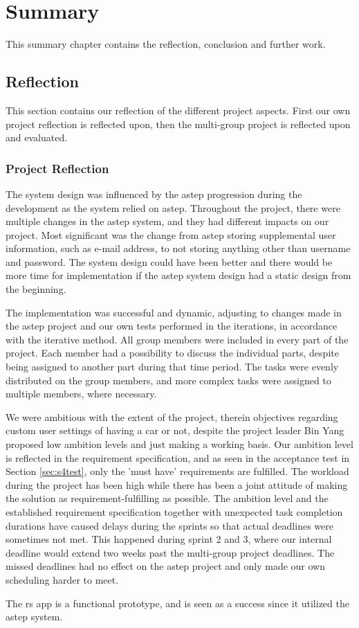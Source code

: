 \chapter{Summary}
This summary chapter contains the reflection, conclusion and further work.

\section{Reflection}
This section contains our reflection of the different project aspects.
First our own project reflection is reflected upon, then the multi-group project is reflected upon and evaluated.

\subsection{Project Reflection}
The system design was influenced by the \gls{astep} progression during the development as the system relied on \gls{astep}.
Throughout the project, there were multiple changes in the \gls{astep} system, and they had different impacts on our project.
Most significant was the change from \gls{astep} storing supplemental user information, such as e-mail address, to not storing anything other than username and password.
The system design could have been better and there would be more time for implementation if the \gls{astep} system design had a static design from the beginning.

The implementation was successful and dynamic, adjusting to changes made in the \gls{astep} project and our own tests performed in the iterations, in accordance with the iterative method.
All group members were included in every part of the project.
Each member had a possibility to discuss the individual parts, despite being assigned to another part during that time period.
The tasks were evenly distributed on the group members, and more complex tasks were assigned to multiple members, where necessary.

We were ambitious with the extent of the project, therein objectives regarding custom user settings of having a car or not, despite the project leader Bin Yang proposed low ambition levels and just making a working basis.
Our ambition level is reflected in the requirement specification, and as seen in the acceptance test in Section \ref{sec:s4test}, only the 'must have' requirements are fulfilled.
The workload during the project has been high while there has been a joint attitude of making the solution as requirement-fulfilling as possible.
The ambition level and the established requirement specification together with unexpected task completion durations have caused delays during the sprints so that actual deadlines were sometimes not met.
This happened during sprint 2 and 3, where our internal deadline would extend two weeks past the multi-group project deadlines.
The missed deadlines had no effect on the \gls{astep} project and only made our own scheduling harder to meet.


The \gls{rs} app is a functional prototype, and is seen as a success since it utilized the \gls{astep} system.


